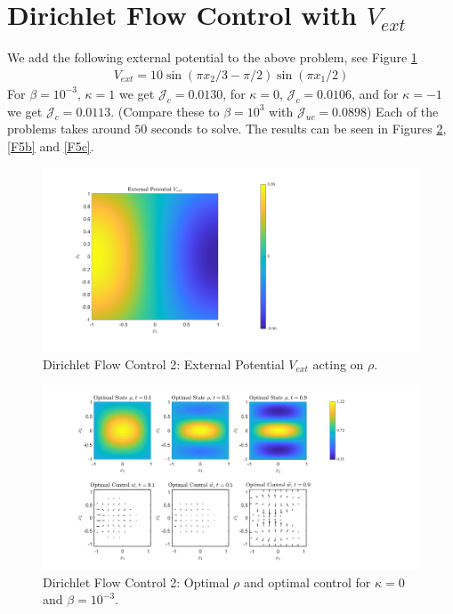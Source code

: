 \documentclass[11pt, a4paper]{article}
\theoremstyle{definition}
\begin{document}
		\section{Dirichlet Flow Control with $V_{ext}$}
	We add the following external potential to the above problem, see Figure \ref{F5V} 
	\begin{align*}
		V_{ext} = 10\sin(\pi x_2/3 - \pi/2)\sin(\pi x_1/2)
	\end{align*}
	For $\beta = 10^{-3}$, $\kappa = 1$ we get $\mathcal J_c = 0.0130$, for $\kappa = 0$, $\mathcal J_c = 0.0106$, and for $\kappa = - 1$ we get $\mathcal J_c = 0.0113$. (Compare these to $\beta = 10^3$ with $\mathcal J_{uc} = 0.0898$) Each of the problems takes around $50$ seconds to solve. The results can be seen in Figures \ref{F5a}, \ref{F5b} and \ref{F5c}.
	
	
	\begin{figure}[h]
		\centering
		\includegraphics[scale=0.35]{FcEx2Vextb.png}
		\caption{Dirichlet Flow Control 2: External Potential $V_{ext}$ acting on $\rho$.} 
		\label{F5V}
	\end{figure}
	\begin{figure}[h]
		\centering
		\includegraphics[scale=0.35]{FcEx2k0b.png}
		\caption{Dirichlet Flow Control 2: Optimal $\rho$ and optimal control for $\kappa = 0$ and $\beta = 10^{-3}$.} 
		\label{F5a}
	\end{figure}
\end{document}
